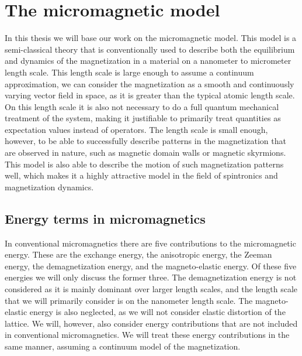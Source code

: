 \chapter{The micromagnetic model}
In this thesis we will base our work on the micromagnetic model. This model is a semi-classical theory that is conventionally used to describe both the equilibrium and dynamics of the magnetization in a material on a nanometer to micrometer length scale. This length scale is large enough to assume a continuum approximation, we can consider the magnetization as a smooth and continuously varying vector field in space, as it is greater than the typical atomic length scale. On this length scale it is also not necessary to do a full quantum mechanical treatment of the system, making it justifiable to primarily treat quantities as expectation values instead of operators. The length scale is small enough, however, to be able to successfully describe patterns in the magnetization that are observed in nature, such as magnetic domain walls or magnetic skyrmions. This model is also able to describe the motion of such magnetization patterns well, which makes it a highly attractive model in the field of spintronics and magnetization dynamics.
\section{Energy terms in micromagnetics}
In conventional micromagnetics there are five contributions to the micromagnetic energy. These are the exchange energy, the anisotropic energy, the Zeeman energy, the demagnetization energy, and the magneto-elastic energy. Of these five energies we will only discuss the former three. The demagnetization energy is not considered as it is mainly dominant over larger length scales, and the length scale that we will primarily consider is on the nanometer length scale. The magneto-elastic energy is also neglected, as we will not consider elastic distortion of the lattice. We will, however, also consider energy contributions that are not included in conventional micromagnetics. We will treat these energy contributions in the same manner, assuming a continuum model of the magnetization.
